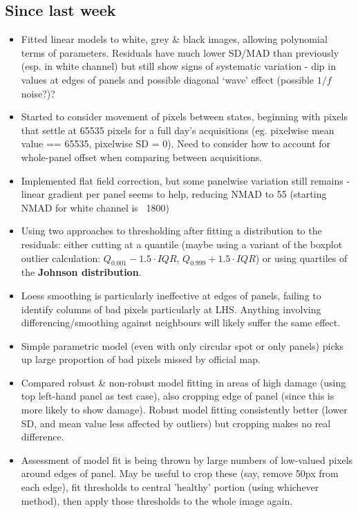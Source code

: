 \documentclass[10pt,fleqn]{article}
\begin{document}
\subsection*{Since last week}

\begin{itemize}

\item Fitted linear models to white, grey \& black images, allowing polynomial terms of parameters. Residuals have much lower SD/MAD than previously (esp. in white channel) but still show signs of systematic variation - dip in values at edges of panels and possible diagonal `wave' effect (possible $1/f$ noise?)?
 
\item Started to consider movement of pixels between states, beginning with pixels that settle at 65535 pixels for a full day's acquisitions (eg. pixelwise mean value == 65535, pixelwise SD = 0). Need to consider how to account for whole-panel offset when comparing between acquisitions.

\item Implemented flat field correction, but some panelwise variation still remains - linear gradient per panel seems to help, reducing NMAD to 55 (starting NMAD for white channel is ~1800)

\item Using two approaches to thresholding after fitting a distribution to the residuals: either cutting at a quantile (maybe using a variant of the boxplot outlier calculation: $Q_{0.001} - 1.5 \cdot IQR$, $Q_{0.999} + 1.5 \cdot IQR$) or using quartiles of the \textbf{Johnson distribution}.

\item Loess smoothing is particularly ineffective at edges of panels, failing to identify columns of bad pixels particularly at LHS. Anything involving differencing/smoothing against neighbours will likely suffer the same effect.

\item Simple parametric model (even with only circular spot or only panels) picks up large proportion of bad pixels missed by official map.

\item Compared robust \& non-robust model fitting in areas of high damage (using top left-hand panel as test case), also cropping edge of panel (since this is more likely to show damage). Robust model fitting consistently better (lower SD, and mean value less affected by outliers) but cropping makes no real difference.

\item Assessment of model fit is being thrown by large numbers of low-valued pixels around edges of panel. May be useful to crop these (say, remove 50px from each edge), fit thresholds to central 'healthy' portion (using whichever method), then apply those thresholds to the whole image again.

\end{itemize}
\end{document}

